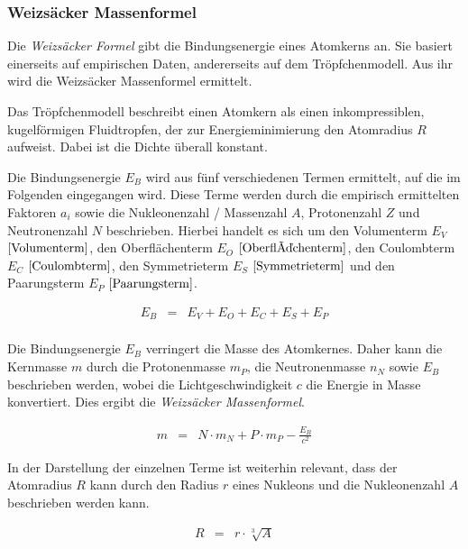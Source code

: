\documentclass[12pt,a4paper]{scrartcl}
\numberwithin{equation}{section} %
\renewcommand{\[}{} %
\renewcommand{\]}{\noindent} %
\begin{document}
\hypertarget{weizsuxe4cker-massenformel}{%
\subsubsection{Weizsäcker
Massenformel}\label{weizsuxe4cker-massenformel}}

Die \emph{Weizsäcker Formel} gibt die Bindungsenergie eines Atomkerns
an. Sie basiert einerseits auf empirischen Daten, andererseits auf dem
Tröpfchenmodell. Aus ihr wird die Weizsäcker Massenformel ermittelt.

Das Tröpfchenmodell beschreibt einen Atomkern als einen inkompressiblen,
kugelförmigen Fluidtropfen, der zur Energieminimierung den Atomradius
\(R\) aufweist. Dabei ist die Dichte überall konstant.

Die Bindungsenergie \(E_B\) wird aus fünf verschiedenen Termen
ermittelt, auf die im Folgenden eingegangen wird. Diese Terme werden
durch die empirisch ermittelten Faktoren \(a_i\) sowie die Nukleonenzahl
/ Massenzahl \(A\), Protonenzahl \(Z\) und Neutronenzahl \(N\)
beschrieben. Hierbei handelt es sich um den Volumenterm \(E_V\)
\(\eqref{Volumenterm}\), den Oberflächenterm \(E_O\)
\(\eqref{Oberflächenterm}\), den Coulombterm \(E_C\)
\(\eqref{Coulombterm}\), den Symmetrieterm \(E_S\)
\(\eqref{Symmetrieterm}\) und den Paarungsterm \(E_P\)
\(\eqref{Paarungsterm}\).

\[
\begin{eqnarray}
    E_B &=& E_V + E_O + E_C + E_S + E_P \\
\end{eqnarray}
\]

Die Bindungsenergie \(E_B\) verringert die Masse des Atomkernes. Daher
kann die Kernmasse \(m\) durch die Protonenmasse \(m_P\), die
Neutronenmasse \(n_N\) sowie \(E_B\) beschrieben werden, wobei die
Lichtgeschwindigkeit \(c\) die Energie in Masse konvertiert. Dies ergibt
die \emph{Weizsäcker Massenformel}.

\[
\begin{eqnarray}
    m &=& N\cdot m_N + P\cdot m_P - \frac{E_B}{c^2}
\end{eqnarray}
\]

In der Darstellung der einzelnen Terme ist weiterhin relevant, dass der
Atomradius \(R\) kann durch den Radius \(r\) eines Nukleons und die
Nukleonenzahl \(A\) beschrieben werden kann.

\[
\begin{eqnarray}
    R &=& r \cdot \sqrt[3]{A}
\end{eqnarray}
\]
\end{document}
